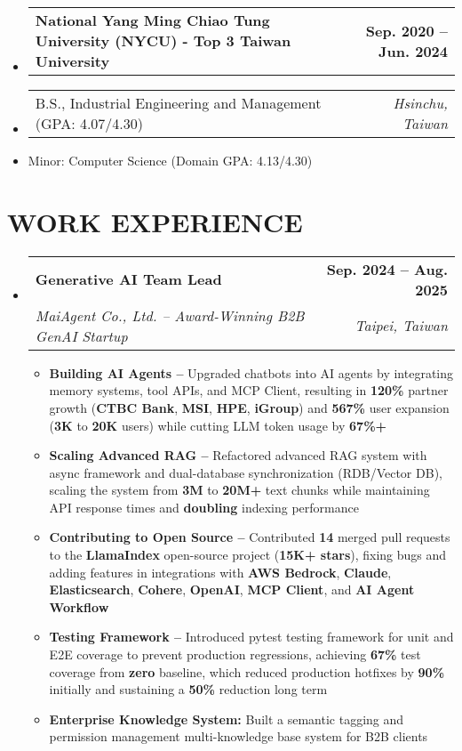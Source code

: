 \documentclass[letterpaper,11pt]{article}
\makeatletter
\newcommand{\resumeItem}[1]{
  \item\small{#1}
}
\newcommand{\resumeSubheadingnull}[2]{
  \item
    \begin{tabular*}{1.0\textwidth}[t]{l@{\extracolsep{\fill}}r}
      \textbf{#1} & \textbf{\small #2} \\
    \end{tabular*}\vspace{3pt}
}
\newcommand{\resumeSubheadinga}[4]{
  \vspace{-3pt}\item
    \begin{tabular*}{1.0\textwidth}[t]{l@{\extracolsep{\fill}}r}
      \textbf{#1} & \textbf{\small #2} \\
      \textit{\small#3} & \textit{\small #4} \\
    \end{tabular*}
}
\newcommand{\resumeSubItema}[2]{
  \item
    \begin{tabular*}{1.0\textwidth}[t]{l@{\extracolsep{\fill}}r}
      \small#1 & \textit{\small #2} \\
    \end{tabular*}
}
\newcommand{\resumeSubItem}[1]{\resumeItem{#1}}
\newcommand{\resumeSubHeadingListStart}{\begin{itemize}[leftmargin=0.0in, label={}]}
\newcommand{\resumeSubHeadingListEnd}{\end{itemize}}
\newcommand{\resumeItemListStart}{\begin{itemize}[label=$\vcenter{\hbox{\tiny$\bullet$}}$]}
\newcommand{\resumeItemListEnd}{\end{itemize}}
\makeatother
\begin{document}
\resumeSubHeadingListStart
\resumeSubheadingnull
{National Yang Ming Chiao Tung University (NYCU) - Top 3 Taiwan University }{Sep. 2020 -- Jun. 2024}
\vspace{-20pt}
\resumeSubItema{B.S., Industrial Engineering and Management (GPA: 4.07/4.30)}{Hsinchu, Taiwan}
\vspace{-15pt}
\resumeSubItem{Minor: Computer Science (Domain GPA: 4.13/4.30)}
\resumeSubHeadingListEnd


\vspace{-6pt}



\section{WORK EXPERIENCE}
\vspace{2pt}
\resumeSubHeadingListStart
\resumeSubheadinga
{Generative AI Team Lead}{Sep. 2024 -- Aug. 2025}
{MaiAgent Co., Ltd. -- Award-Winning B2B GenAI Startup}{Taipei, Taiwan}
\vspace{-6pt}
\resumeItemListStart
\resumeItem{\textbf{Building AI Agents --} Upgraded chatbots into AI agents by integrating memory systems, tool APIs, and MCP Client, resulting in \textbf{120\%} partner growth (\textbf{CTBC Bank}, \textbf{MSI}, \textbf{HPE}, \textbf{iGroup}) and \textbf{567\%} user expansion (\textbf{3K} to \textbf{20K} users) while cutting LLM token usage by \textbf{67\%+}}
\resumeItem{\textbf{Scaling Advanced RAG --} Refactored advanced RAG system with async framework and dual-database synchronization (RDB/Vector DB), scaling the system from \textbf{3M} to \textbf{20M+} text chunks while maintaining API response times and \textbf{doubling} indexing performance}
\resumeItem{\textbf{Contributing to Open Source --} Contributed \textbf{14} merged pull requests to the \textbf{LlamaIndex} open-source project (\textbf{15K+ stars}), fixing bugs and adding features in integrations with \textbf{AWS Bedrock}, \textbf{Claude}, \textbf{Elasticsearch}, \textbf{Cohere}, \textbf{OpenAI}, \textbf{MCP Client}, and \textbf{AI Agent Workflow}}
\resumeItem{\textbf{Testing Framework --} Introduced pytest testing framework for unit and E2E coverage to prevent production regressions, achieving \textbf{67\%} test coverage from \textbf{zero} baseline, which reduced production hotfixes by \textbf{90\%} initially and sustaining a \textbf{50\%} reduction long term}
\resumeItem{\textbf{Enterprise Knowledge System:} Built a semantic tagging and permission management multi-knowledge base system for B2B clients}
\resumeItemListEnd
\resumeSubHeadingListEnd
\end{document}
